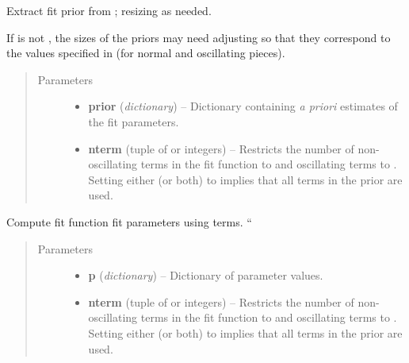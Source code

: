 \documentclass[letterpaper,10pt,english]{sphinxmanual}
\begin{document}
\begin{fulllineitems}
\begin{fulllineitems}
\end{fulllineitems}


\begin{fulllineitems}
\label{corrfitter:corrfitter.BaseModel.buildprior}
Extract fit prior from ; resizing as needed.

If  is not , the sizes of the priors may need
adjusting so that they correspond to the values specified in 
 (for normal and oscillating pieces).
\begin{quote}\begin{description}
\item[{Parameters}] \leavevmode\begin{itemize}
\item {} 
\textbf{prior} (\emph{dictionary}) -- Dictionary containing \emph{a priori} estimates of the 
fit parameters.

\item {} 
\textbf{nterm} (tuple of  or integers) -- Restricts the number of non-oscillating terms in the
fit function to  and oscillating terms to
. Setting either (or both) to  implies that
all terms in the prior are used.

\end{itemize}

\end{description}\end{quote}

\end{fulllineitems}


\begin{fulllineitems}
\label{corrfitter:corrfitter.BaseModel.fitfcn}
Compute fit function fit parameters  using  terms. ``
\begin{quote}\begin{description}
\item[{Parameters}] \leavevmode\begin{itemize}
\item {} 
\textbf{p} (\emph{dictionary}) -- Dictionary of parameter values.

\item {} 
\textbf{nterm} (tuple of  or integers) -- Restricts the number of non-oscillating terms in the
fit function to  and oscillating terms to
. Setting either (or both) to  implies that
all terms in the prior are used.


\end{itemize}
\end{description}
\end{quote}
\end{fulllineitems}
\end{fulllineitems}
\end{document}
